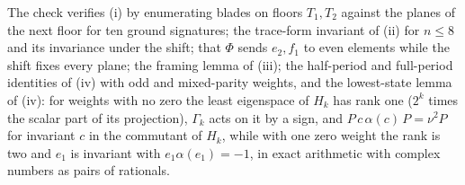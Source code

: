 The check verifies (i) by enumerating blades on floors $T_{1}, T_{2}$ against the planes of the next floor for ten ground signatures; the trace-form invariant of (ii) for $n \le 8$ and its invariance under the shift; that $\Phi$ sends $e_{2}, f_{1}$ to even elements while the shift fixes every plane; the framing lemma of (iii); the half-period and full-period identities of (iv) with odd and mixed-parity weights, and the lowest-state lemma of (iv): for weights with no zero the least eigenspace of $H_{k}$ has rank one ($2^{k}$ times the scalar part of its projection), $\Gamma_{k}$ acts on it by a sign, and $P\,c\,\alpha(c)\,P = \nu^{2}P$ for invariant $c$ in the commutant of $H_{k}$, while with one zero weight the rank is two and $e_{1}$ is invariant with $e_{1}\alpha(e_{1}) = -1$, in exact arithmetic with complex numbers as pairs of rationals.
